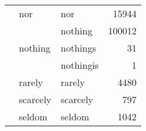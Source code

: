\begin{longtable}[ht]{lllr}
\cline{2-4}
 & nor & nor & {\cellcolor[HTML]{E8F6B1}} \color[HTML]{000000} 15944 \\
\cline{2-4}
 & \multirow[c]{3}{*}{nothing} & nothing & {\cellcolor[HTML]{1F2F87}} \color[HTML]{F1F1F1} 100012 \\
 &  & nothings & {\cellcolor[HTML]{FFFFD9}} \color[HTML]{000000} 31 \\
 &  & nothingis & {\cellcolor[HTML]{FFFFD9}} \color[HTML]{000000} 1 \\
\cline{2-4}
 & rarely & rarely & {\cellcolor[HTML]{F9FDCC}} \color[HTML]{000000} 4480 \\
\cline{2-4}
 & scarcely & scarcely & {\cellcolor[HTML]{FEFFD8}} \color[HTML]{000000} 797 \\
\cline{2-4}
 & seldom & seldom & {\cellcolor[HTML]{FEFFD6}} \color[HTML]{000000} 1042 \\
\cline{1-4} \cline{2-4}
\end{longtable}
